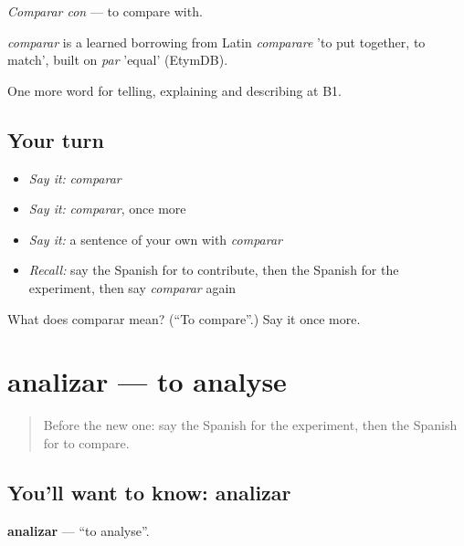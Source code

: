 \emph{Comparar con} — to compare with.

\begin{cousinweb}
\emph{comparar} is a learned borrowing from Latin \emph{comparare} 'to put together, to match', built on \emph{par} 'equal' (EtymDB).
\end{cousinweb}

\begin{grammarlens}[title={What you've built}]
One more word for telling, explaining and describing at B1.
\end{grammarlens}

\subsection*{Your turn}
\begin{itemize}
\raggedright
  \item \emph{Say it:} \emph{comparar}
  \item \emph{Say it:} \emph{comparar}, once more
  \item \emph{Say it:} a sentence of your own with \emph{comparar}
  \item \emph{Recall:} say the Spanish for to contribute, then the Spanish for the experiment, then say \emph{comparar} again
\end{itemize}

\begin{tcolorbox}[breakable,colback=teal!4,colframe=teal!35!black,title={Before you move on}]
What does comparar mean? (\textquotedblleft{}To compare\textquotedblright{}.) Say it once more.
\end{tcolorbox}
\section[analizar]{analizar — to analyse}

\label{lesson:ES-C599-analizar}



\begin{quote}
Before the new one: say the Spanish for the experiment, then the Spanish for to compare.
\end{quote}

\subsection*{You'll want to know: analizar}
\textbf{analizar} — \textquotedblleft{}to analyse\textquotedblright{}.

